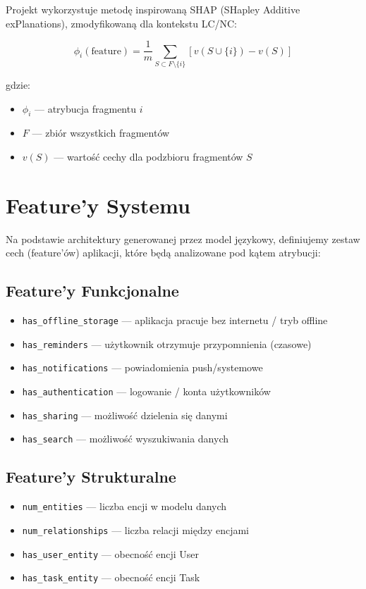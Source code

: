 \documentclass[12pt,a4paper]{article}
\begin{document}
Projekt wykorzystuje metodę inspirowaną SHAP (SHapley Additive exPlanations), zmodyfikowaną dla kontekstu LC/NC:

\begin{equation}
\phi_i(\text{feature}) = \frac{1}{m} \sum_{S \subset F \setminus \{i\}} \left[ v(S \cup \{i\}) - v(S) \right]
\end{equation}

gdzie:
\begin{itemize}
    \item $\phi_i$ --- atrybucja fragmentu $i$
    \item $F$ --- zbiór wszystkich fragmentów
    \item $v(S)$ --- wartość cechy dla podzbioru fragmentów $S$
\end{itemize}

\section{Feature'y Systemu}
Na podstawie architektury generowanej przez model językowy, definiujemy zestaw cech (feature'ów) aplikacji, które będą analizowane pod kątem atrybucji:

\subsection{Feature'y Funkcjonalne}
\begin{itemize}
    \item \texttt{has\_offline\_storage} --- aplikacja pracuje bez internetu / tryb offline
    \item \texttt{has\_reminders} --- użytkownik otrzymuje przypomnienia (czasowe)
    \item \texttt{has\_notifications} --- powiadomienia push/systemowe
    \item \texttt{has\_authentication} --- logowanie / konta użytkowników
    \item \texttt{has\_sharing} --- możliwość dzielenia się danymi
    \item \texttt{has\_search} --- możliwość wyszukiwania danych
\end{itemize}

\subsection{Feature'y Strukturalne}
\begin{itemize}
    \item \texttt{num\_entities} --- liczba encji w modelu danych
    \item \texttt{num\_relationships} --- liczba relacji między encjami
    \item \texttt{has\_user\_entity} --- obecność encji User
    \item \texttt{has\_task\_entity} --- obecność encji Task
\end{itemize}
\end{document}
